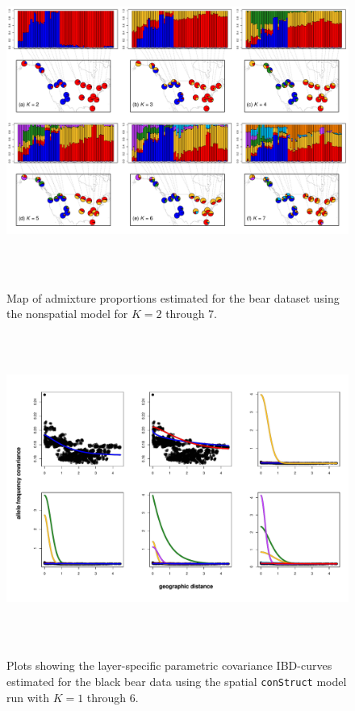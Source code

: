 \documentclass[12pt]{article}
\begin{document}
\begin{figure}
	\centering
		{\includegraphics[width=6in,height=4in]{figs/bears/bear_nsp_results.pdf}}
	\caption{
	Map of admixture proportions estimated for the bear dataset 
	using the nonspatial model for $K=2$ through 7.
    }\label{bear_nsp_pies}
\end{figure}

\begin{figure}
	\centering
		{\includegraphics[width=6in,height=4in]{figs/bears/bear_sp_layer_covs.pdf}}
	\caption{
	Plots showing the layer-specific parametric covariance IBD-curves 
	estimated for the black bear data using 
	the spatial \texttt{conStruct} model run with $K=1$ through 6.
	 }\label{bear_sp_layer_covs}
\end{figure}
\end{document}

